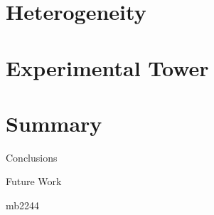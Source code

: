 \documentclass{beamer}
\begin{document}
\section{Heterogeneity}
\section{Experimental Tower}

\section{Summary}
\begin{frame}{Conclusions}
\end{frame}
\begin{frame}{Future Work}
\end{frame}

\begin{frame}
\Huge{\centerline{mb2244}}
\end{frame}
\end{document}
